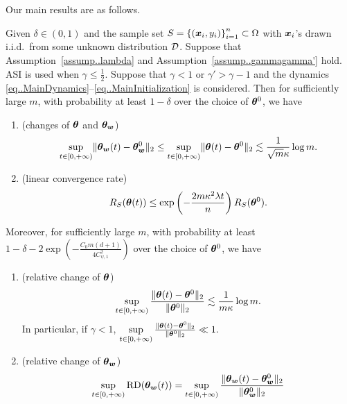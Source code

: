 \documentclass[twoside,11pt]{article}
\begin{document}
Our main results are as follows.
\begin{thm}\label{thm..LinearRegime}
    Given $\delta\in(0,1)$ and the sample set $S = {\{(\bm{x}_i, y_i)\}}_{i=1}^n\subset\Omega$ with $\bm{x}_i$'s drawn i.i.d.\ from some unknown distribution $\mathcal{D}$. Suppose that Assumption~\ref{assump..lambda} and Assumption~\ref{assump..gammagamma'} hold. ASI is used when $\gamma\leq\frac{1}{2}$. Suppose that $\gamma<1$ or $\gamma'>\gamma-1$ and the dynamics \eqref{eq..MainDynamics}--\eqref{eq..MainInitialization} is considered. Then for sufficiently large $m$, with probability at least $1-\delta$ over the choice of $\bm{\theta}^0$, we have
    \begin{enumerate}[label=(\alph*)]
        \item (changes of $\bm{\theta}$ and $\bm{\theta}_{\bm{w}}$)
              \begin{equation}
                  \sup\limits_{t\in[0,+\infty)}\lVert\bm{\theta}_{\bm{w}}(t)-\bm{\theta}_{\bm{w}}^0\rVert_2\leq \sup\limits_{t\in[0,+\infty)}\lVert\bm{\theta}(t)-\bm{\theta}^0\rVert_2\lesssim\frac{1}{\sqrt{m}\kappa}\log m.
              \end{equation}
        \item (linear convergence rate)
              \begin{equation}
                  R_S(\bm{\theta}(t))\leq \exp\left(-\frac{2m\kappa^2\lambda t}{n}\right)R_S(\bm{\theta}^0).
              \end{equation}
    \end{enumerate}
    Moreover, for sufficiently large $m$, with probability at least $1-\delta-2\exp\left(-\frac{C_0m(d+1)}{4C^2_{\psi,1}}\right)$ over the choice of $\bm{\theta}^0$, we have
    \begin{enumerate}[resume*]
        \item (relative change of $\bm{\theta}$)
              \begin{equation}
                  \sup\limits_{t\in[0,+\infty)}\frac{\lVert\bm{\theta}(t)-\bm{\theta}^0\rVert_2}{\lVert\bm{\theta}^0\rVert_2}\lesssim\frac{1}{m\kappa}\log m.
              \end{equation}
              In particular, if $\gamma<1$, $\sup\limits_{t\in[0,+\infty)}\frac{\lVert\bm{\theta}(t)-\bm{\theta}^0\rVert_2}{\lVert\bm{\theta}^0\rVert_2}\ll 1.$
        \item (relative change of $\bm{\theta}_{\bm{w}}$)
              \begin{equation}
                  \sup\limits_{t\in[0,+\infty)}\mathrm{RD}(\vtheta_{\vw}(t))=\sup\limits_{t\in[0,+\infty)}\frac{\norm{\vtheta_{\vw}(t)-\vtheta_{\vw}^0}_2}{\norm{\vtheta_{\vw}^0}_2}

\end{equation}
\end{enumerate}
\end{thm}
\end{document}
